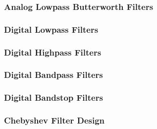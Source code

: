 \subsubsection{Analog Lowpass Butterworth Filters}
\subsubsection{Digital Lowpass Filters}
\subsubsection{Digital Highpass Filters}
\subsubsection{Digital Bandpass Filters}
\subsubsection{Digital Bandstop Filters}
\subsubsection{Chebyshev Filter Design}
